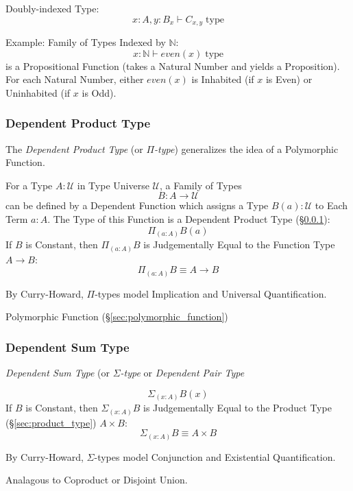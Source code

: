 Doubly-indexed Type:
\[
  x : A, y : B_x \vdash C_{x,y} \;\text{type}
\]

Example: Family of Types Indexed by $\mathbb{N}$:
\[
  x : \mathbb{N} \vdash even(x) \;\text{type}
\]
is a Propositional Function (takes a Natural Number and yields a
Proposition). For each Natural Number, either $even(x)$ is Inhabited
(if $x$ is Even) or Uninhabited (if $x$ is Odd).\cite{harper12}



\subsubsection{Dependent Product Type}\label{sec:dependent_product}

The \emph{Dependent Product Type} (or \emph{$\Pi$-type}) generalizes
the idea of a Polymorphic Function.

For a Type $A : \mathcal{U}$ in Type Universe $\mathcal{U}$, a Family
of Types
\[
  B : A \rightarrow \mathcal{U}
\]
can be defined by a Dependent Function which assigns a Type $B(a) :
\mathcal{U}$ to Each Term $a : A$. The Type of this Function is a
Dependent Product Type (\S\ref{sec:dependent_product}):
\[
  \Pi_{(a:A)}B(a)
\]
If $B$ is Constant, then $\Pi_(a:A)B$ is Judgementally Equal to the
Function Type $A \rightarrow B$:
\[
  \Pi_{(a:A)}B \equiv A \rightarrow B
\]

By Curry-Howard, $\Pi$-types model Implication and Universal
Quantification.

Polymorphic Function (\S\ref{sec:polymorphic_function})



\subsubsection{Dependent Sum Type}\label{sec:dependent_sum}

\emph{Dependent Sum Type} (or \emph{$\Sigma$-type} or \emph{Dependent
  Pair Type}

\[
  \Sigma_{(x:A)} B(x)
\]
If $B$ is Constant, then $\Sigma_{(x:A)}B$ is Judgementally Equal to
the Product Type (\S\ref{sec:product_type}) $A \times B$:
\[
  \Sigma_{(x:A)} B \equiv A \times B
\]

By Curry-Howard, $\Sigma$-types model Conjunction and Existential
Quantification.

Analagous to Coproduct or Disjoint Union.



